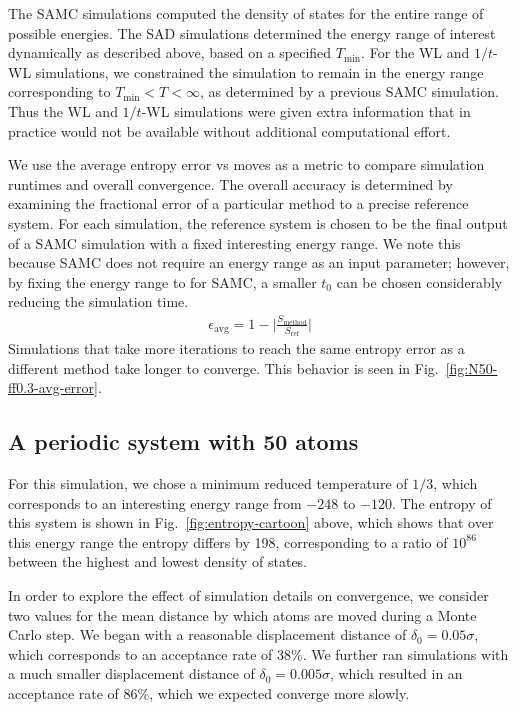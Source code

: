 \documentclass[letterpaper,twocolumn,amsmath,amssymb,pre,aps,10pt]{revtex4-1}
\begin{document}
The SAMC simulations
computed the density of states for the entire range of possible
energies.  The SAD simulations determined the energy range of interest
dynamically as described above, based on a specified $T_{\min}$.  For
the WL and $1/t$-WL simulations, we constrained the simulation to
remain in the energy range corresponding to $T_{\min} < T < \infty$,
as determined by a previous SAMC simulation.  Thus the WL and $1/t$-WL
simulations were given extra information that in practice would not be
available without additional computational effort.

We use the average entropy error vs moves as a metric to compare
simulation runtimes and overall convergence. The overall accuracy
is determined by examining the fractional error of a particular method to
a precise reference system. For each simulation, the reference system
is chosen to be the final output of a SAMC simulation with a fixed interesting energy range.
We note this because SAMC does not require an energy range as an input parameter; however,
by fixing the energy range to for SAMC, a smaller $t_0$ can be chosen considerably reducing the
simulation time.
\begin{align}
\epsilon_\text{avg} = 1 - \bigg\lvert\frac{S_\text{method}}{S_\text{ref}}\bigg\rvert
\end{align}
Simulations that take more iterations to reach the same entropy error as a
different method take longer to converge. This behavior is seen in
Fig.~\ref{fig:N50-ff0.3-avg-error}.

\subsection{A periodic system with 50 atoms}

For this simulation, we chose a minimum reduced
temperature of $1/3$, which corresponds to an interesting energy range
from $-248$ to $-120$.  The entropy of this system is shown in
Fig.~\ref{fig:entropy-cartoon} above, which shows that over this
energy range the entropy differs by 198, corresponding to a ratio of
$10^{86}$ between the highest and lowest density of states.

In order to explore the effect of simulation details on convergence,
we consider two values for the mean distance by which atoms are moved
during a Monte Carlo step.  We began with a reasonable displacement
distance of $\delta_0 = 0.05\sigma$, which corresponds to an
acceptance rate of 38\%.  We further ran simulations with a much
smaller displacement distance of $\delta_0 = 0.005\sigma$, which
resulted in an acceptance rate of 86\%, which we expected converge
more slowly.
\end{document}
